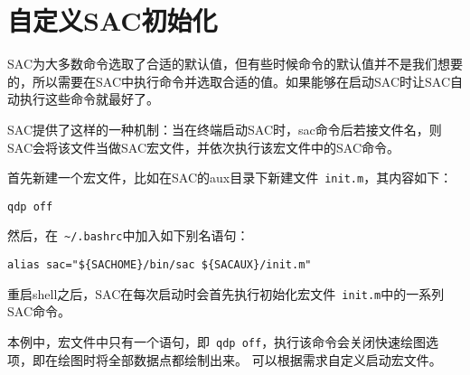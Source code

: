 \section{自定义SAC初始化}
SAC为大多数命令选取了合适的默认值，但有些时候命令的默认值并不是我们想要的，所以需要在SAC中执行命令并选取合适的值。如果能够在启动SAC时让SAC自动执行这些命令就最好了。

SAC提供了这样的一种机制：当在终端启动SAC时，sac命令后若接文件名，则SAC会将该文件当做SAC宏文件，并依次执行该宏文件中的SAC命令。

首先新建一个宏文件，比如在SAC的aux目录下新建文件~\verb+init.m+，其内容如下：
\begin{verbatim}
qdp off
\end{verbatim}

然后，在~\verb+~/.bashrc+中加入如下别名语句：
\begin{verbatim}
alias sac="${SACHOME}/bin/sac ${SACAUX}/init.m"
\end{verbatim}

重启shell之后，SAC在每次启动时会首先执行初始化宏文件~\verb+init.m+中的一系列SAC命令。

本例中，宏文件中只有一个语句，即~\verb+qdp off+，执行该命令会关闭快速绘图选项，即在绘图时将全部数据点都绘制出来。
可以根据需求自定义启动宏文件。
